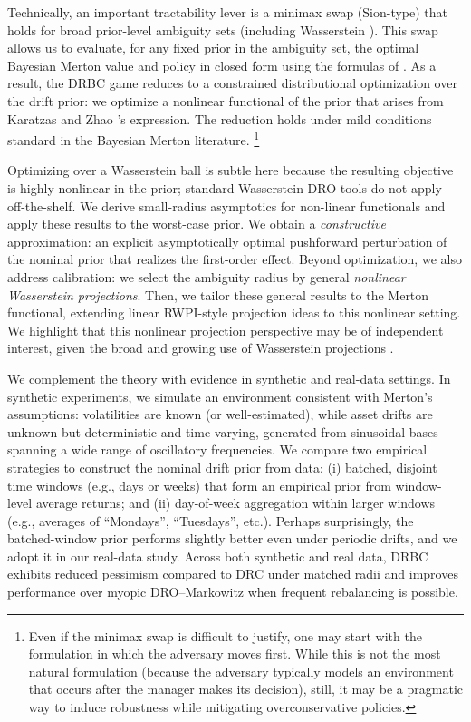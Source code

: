 \documentclass[11pt]{article}
\theoremstyle{definition}
\begin{document}
Technically, an important tractability lever is a minimax swap (Sion-type) that holds for broad prior-level ambiguity sets (including Wasserstein%
). This swap allows us to evaluate, for any fixed prior in the ambiguity set, the optimal Bayesian Merton value and policy in closed form using the formulas of \cite{KZ98}. As a result, the DRBC game reduces to a constrained distributional optimization over the drift prior: we optimize a nonlinear functional of the prior that arises from Karatzas and Zhao \cite{KZ98}'s expression. The reduction holds under mild conditions standard in the Bayesian Merton literature. \footnote{Even if the minimax swap is difficult to justify, one may start with the formulation in which the adversary moves first. While this is not the most natural formulation (because the adversary typically models an environment that occurs after the manager makes its decision), still, it may be a pragmatic way to induce robustness while mitigating overconservative policies.}

Optimizing over a Wasserstein ball is subtle here because the resulting objective is highly nonlinear in the prior; standard Wasserstein DRO tools do not apply off-the-shelf. We derive small-radius asymptotics for non-linear functionals and apply these results to the worst-case prior. We obtain a \emph{constructive} approximation: an explicit asymptotically optimal pushforward perturbation of the nominal prior that realizes the first-order effect. Beyond optimization, we also address calibration: we select the ambiguity radius by general \emph{nonlinear Wasserstein projections}. Then, we tailor these general results to the Merton functional, extending linear RWPI-style projection ideas to this nonlinear setting. We highlight that this nonlinear projection perspective may be of independent interest, given the broad and growing use of Wasserstein projections \citep{SiMurthyBlanchetNguyen2021,Blanchet2021WassersteinDRO}.

We complement the theory with evidence in synthetic and real-data settings. In synthetic experiments, we simulate an environment consistent with Merton's assumptions: volatilities are known (or well-estimated), while asset drifts are unknown but deterministic and time-varying, generated from sinusoidal bases spanning a wide range of oscillatory frequencies. We compare two empirical strategies to construct the nominal drift prior from data: (i) batched, disjoint time windows (e.g., days or weeks) that form an empirical prior from window-level average returns; and (ii) day-of-week aggregation within larger windows (e.g., averages of ``Mondays'', ``Tuesdays'', etc.). Perhaps surprisingly, the batched-window prior performs slightly better even under periodic drifts, and we adopt it in our real-data study. Across both synthetic and real data, DRBC exhibits reduced pessimism compared to DRC under matched radii and improves performance over myopic DRO--Markowitz when frequent rebalancing is possible.
\end{document}
